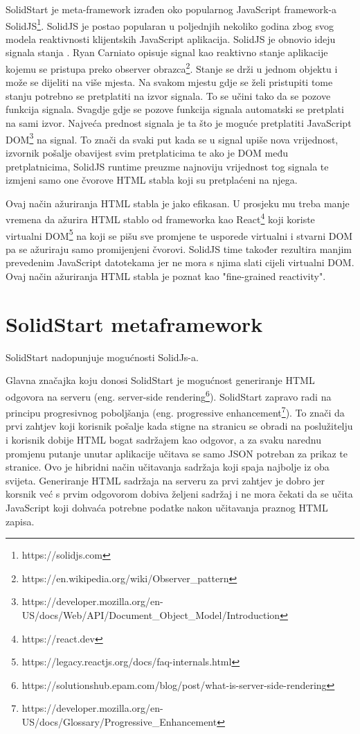 \documentclass[times, utf8, zavrsni]{fer}
\begin{document}
SolidStart je meta-framework izrađen oko popularnog JavaScript framework-a SolidJS\footnote{https://solidjs.com}. SolidJS je postao popularan u poljednjih nekoliko godina zbog svog modela reaktivnosti klijentskih JavaScript aplikacija.
SolidJS je obnovio ideju signala stanja \citep{ryan2023signal}. Ryan Carniato opisuje signal  kao reaktivno stanje aplikacije kojemu se pristupa preko observer obrazca\footnote{https://en.wikipedia.org/wiki/Observer\_pattern}.
Stanje se drži u jednom objektu i može se dijeliti na više mjesta. Na svakom mjestu gdje se želi pristupiti tome stanju potrebno se pretplatiti na izvor signala. To se učini tako da se pozove funkcija signala.
Svagdje gdje se pozove funkcija signala automatski se pretplati na sami izvor.
Najveća prednost signala je ta što je moguće pretplatiti JavaScript DOM\footnote{https://developer.mozilla.org/en-US/docs/Web/API/Document\_Object\_Model/Introduction} na signal.
To znači da svaki put kada se u signal upiše nova vrijednost, izvornik pošalje obavijest svim pretplaticima te ako je DOM među pretplatnicima, SolidJS runtime preuzme najnoviju vrijednost tog signala te izmjeni samo
one čvorove HTML stabla koji su pretplaćeni na njega.

Ovaj način ažuriranja HTML stabla je jako efikasan. U prosjeku mu treba manje vremena da ažurira HTML stablo od frameworka kao React\footnote{https://react.dev} koji koriste virtualni DOM\footnote{https://legacy.reactjs.org/docs/faq-internals.html} na koji se pišu sve promjene te usporede virtualni i stvarni DOM pa se ažuriraju samo promijenjeni čvorovi.
SolidJS time također rezultira manjim prevedenim JavaScript datotekama jer ne mora s njima slati cijeli virtualni DOM.
Ovaj način ažuriranja HTML stabla je poznat kao "fine-grained reactivity"\citep{ryan2021reactivity}.

\section{SolidStart metaframework}

SolidStart nadopunjuje mogućnosti SolidJs-a.

Glavna značajka koju donosi SolidStart je mogućnost generiranje HTML odgovora na serveru (eng. server-side rendering\footnote{https://solutionshub.epam.com/blog/post/what-is-server-side-rendering}).
SolidStart zapravo radi na principu progresivnog poboljšanja (eng. progressive enhancement\footnote{https://developer.mozilla.org/en-US/docs/Glossary/Progressive_Enhancement}).
To znači da prvi zahtjev koji korisnik pošalje kada stigne na stranicu se obradi na poslužitelju i korisnik dobije HTML bogat sadržajem kao odgovor, a za svaku narednu promjenu putanje unutar aplikacije učitava se samo JSON potreban za prikaz te stranice.
Ovo je hibridni način učitavanja sadržaja koji spaja najbolje iz oba svijeta.
Generiranje HTML sadržaja na serveru za prvi zahtjev je dobro jer korsnik već s prvim odgovorom dobiva željeni sadržaj i ne mora čekati da se učita JavaScript koji dohvaća potrebne podatke nakon učitavanja praznog HTML zapisa.
\end{document}

